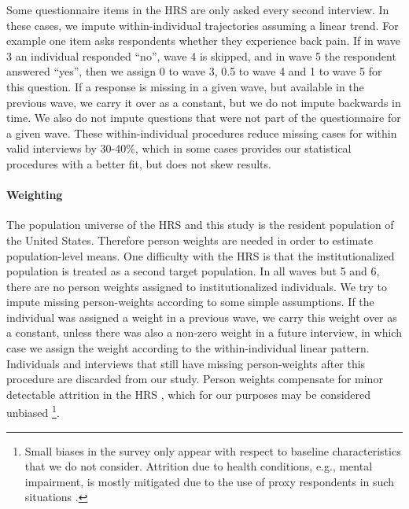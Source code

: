 \documentclass[11pt,oneside]{article} %
\begin{document}
Some questionnaire items in the HRS are only asked every second interview. In
these cases, we impute within-individual trajectories assuming a linear
trend. For example one item asks respondents whether they experience back
pain. If in wave 3 an individual responded ``no'', wave 4 is skipped, and in
wave 5 the respondent answered ``yes'', then we assign 0 to wave 3, 0.5 to wave
4 and 1 to wave 5 for this question. If a response is missing in a given wave,
but available in the previous wave, we carry it over as a constant, but we do
not impute backwards in time. We also do not impute questions that were not part
of the questionnaire for a given wave. These within-individual procedures reduce
missing cases for within valid interviews by 30-40\%, which in some cases provides our statistical
procedures with a better fit, but does not skew results.

\paragraph*{Weighting}
The population universe of the HRS and this study is the resident
population of the United States. Therefore person weights are needed in
order to estimate population-level means. 
One difficulty with the HRS is that the institutionalized population is treated
as a second target population. In all waves but 5 and 6, there are no person weights
assigned to institutionalized individuals. We try to impute missing
person-weights according to some simple assumptions. If the individual was
assigned a weight in a previous wave, we carry this weight over as a constant, unless there was also a non-zero weight in a future interview, in
which case we assign the weight according to the within-individual linear
pattern. Individuals and interviews that still have missing person-weights
after this procedure are discarded from our study. Person weights compensate for
minor detectable attrition in the HRS \citep{kapteyn2006effects}, which for
our purposes may be considered unbiased \footnote{Small biases in the survey
only appear with respect to baseline characteristics that we do not consider.
Attrition due to health conditions, e.g., mental impairment, is mostly mitigated
due to the use of proxy respondents in such situations \citep{weir2011proxy}.}.
\end{document}
